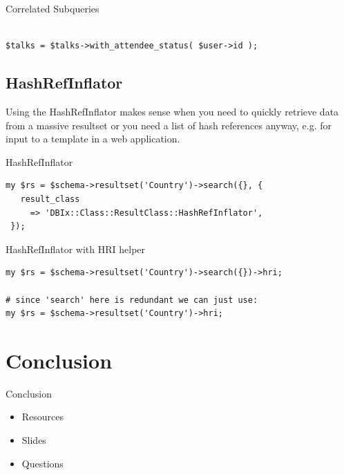 \begin{frame}[fragile]{Correlated Subqueries}
\begin{lstlisting}
      
$talks = $talks->with_attendee_status( $user->id );

\end{lstlisting}
\end{frame}

\subsection{HashRefInflator}

Using the HashRefInflator makes sense when you need to quickly retrieve
data from a massive resultset or you need a list of hash references anyway,
e.g. for input to a template in a web application.

\begin{frame}[fragile]{HashRefInflator}
\begin{lstlisting}
my $rs = $schema->resultset('Country')->search({}, {
   result_class
     => 'DBIx::Class::ResultClass::HashRefInflator',
 });
\end{lstlisting}
\end{frame}

\begin{frame}[fragile]{HashRefInflator with HRI helper}
\begin{lstlisting}
my $rs = $schema->resultset('Country')->search({})->hri;

# since 'search' here is redundant we can just use:
my $rs = $schema->resultset('Country')->hri;
\end{lstlisting}
\end{frame}

\section{Conclusion}

\begin{frame}{Conclusion}
\begin{itemize}
\item Resources
\item Slides
\item Questions
\end{itemize}
\end{frame}

